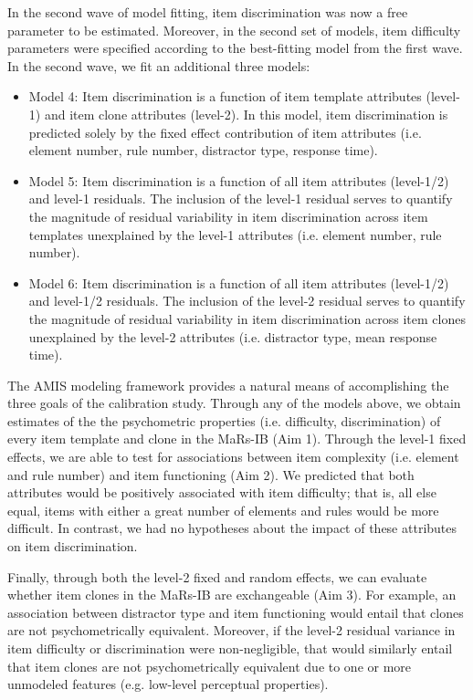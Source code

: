 \documentclass[a4paper,man,natbib]{apa6}
\begin{document}
In the second wave of model fitting, item discrimination was now a free parameter to be estimated. Moreover, in the second set of models, item difficulty parameters were specified according to the best-fitting model from the first wave. In the second wave, we fit an additional three models:

\begin{itemize}

    \item Model 4: Item discrimination is a function of item template attributes (level-1) and item clone attributes (level-2). In this model, item discrimination is predicted solely by the fixed effect contribution of item attributes (i.e. element number, rule number, distractor type, response time). 
    
    \item Model 5: Item discrimination is a function of all item attributes (level-1/2) and level-1 residuals. The inclusion of the level-1 residual serves to quantify the magnitude of residual variability in item discrimination across item templates unexplained by the level-1 attributes (i.e. element number, rule number).
    
    \item Model 6: Item discrimination is a function of all item attributes (level-1/2) and level-1/2 residuals. The inclusion of the level-2 residual serves to quantify the magnitude of residual variability in item discrimination across item clones unexplained by the level-2 attributes (i.e. distractor type, mean response time).
    
\end{itemize}

The AMIS modeling framework provides a natural means of accomplishing the three goals of the calibration study. Through any of the models above, we obtain estimates of the the psychometric properties (i.e. difficulty, discrimination) of every item template and clone in the MaRs-IB (Aim 1). Through the level-1 fixed effects, we are able to test for associations between item complexity (i.e. element and rule number) and item functioning (Aim 2). We predicted that both attributes would be positively associated with item difficulty; that is, all else equal, items with either a great number of elements and rules would be more difficult. In contrast, we had no hypotheses about the impact of these attributes on item discrimination. 

Finally, through both the level-2 fixed and random effects, we can evaluate whether item clones in the MaRs-IB are exchangeable (Aim 3). For example, an association between distractor type and item functioning would entail that clones are not psychometrically equivalent. Moreover, if the level-2 residual variance in item difficulty or discrimination were non-negligible, that would similarly entail that item clones are not psychometrically equivalent due to one or more unmodeled features (e.g. low-level perceptual properties).
\end{document}
